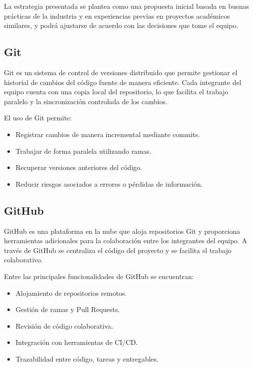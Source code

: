 \documentclass[12pt]{article}
\begin{document}
La estrategia presentada se plantea como una propuesta inicial basada en buenas prácticas de la industria y en experiencias previas en proyectos académicos similares, y podrá ajustarse de acuerdo con las decisiones que tome el equipo.

\subsection{Git}

Git es un sistema de control de versiones distribuido que permite gestionar el historial de cambios del código fuente de manera eficiente. Cada integrante del equipo cuenta con una copia local del repositorio, lo que facilita el trabajo paralelo y la sincronización controlada de los cambios.

El uso de Git permite:
\begin{itemize}
    \item Registrar cambios de manera incremental mediante commits.
    \item Trabajar de forma paralela utilizando ramas.
    \item Recuperar versiones anteriores del código.
    \item Reducir riesgos asociados a errores o pérdidas de información.
\end{itemize}

\subsection{GitHub}

GitHub es una plataforma en la nube que aloja repositorios Git y proporciona herramientas adicionales para la colaboración entre los integrantes del equipo. A través de GitHub se centraliza el código del proyecto y se facilita el trabajo colaborativo.

Entre las principales funcionalidades de GitHub se encuentran:
\begin{itemize}
    \item Alojamiento de repositorios remotos.
    \item Gestión de ramas y Pull Requests.
    \item Revisión de código colaborativa.
    \item Integración con herramientas de CI/CD.
    \item Trazabilidad entre código, tareas y entregables.
\end{itemize}
\end{document}
